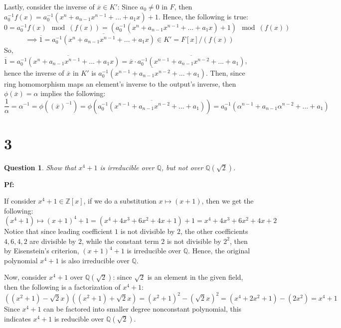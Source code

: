 \documentclass{article}
\newtheorem{question}{Question}
\begin{document}
\hfil

Lastly, consider the inverse of $\overline{x}\in K'$: Since $a_0\neq 0$ in $F$, then $a_0^{-1}f(x)=a_0^{-1}(x^n+a_{n-1}x^{n-1}+...+a_1x)+1$.
Hence, the following is true:
$$0=a_0^{-1}f(x)\mod (f(x)) = (a_0^{-1}(x^n+a_{n-1}x^{n-1}+...+a_1x)+1)\mod (f(x))$$
$$\implies \overline{1}=\overline{a_0^{-1}(x^n+a_{n-1}x^{n-1}+...+a_1x)}\in K' = F[x]/(f(x))$$
So, $\overline{1}=\overline{a_0^{-1}(x^n+a_{n-1}x^{n-1}+...+a_1x)}=\overline{x}\cdot \overline{a_0^{-1}(x^{n-1}+a_{n-1}x^{n-2}+...+a_1)}$, hence the inverse of $\overline{x}$ in $K'$ is $\overline{a_0^{-1}(x^{n-1}+a_{n-1}x^{n-2}+...+a_1)}$.
Then, since ring homomorphism maps an element's inverse to the output's inverse, then $\phi(\overline{x})=\alpha$ implies the following: 
$$\frac{1}{\alpha}=\alpha^{-1}=\phi((\overline{x})^{-1})=\phi\left(\overline{a_0^{-1}(x^{n-1}+a_{n-1}x^{n-2}+...+a_1)}\right)=a_0^{-1}(\alpha^{n-1}+a_{n-1}\alpha^{n-2}+...+a_1)$$


\break

\section*{3}
\begin{myBox}[]{}
    \begin{question}
        Show that $x^4+1$ is irreducible over $\mathbb{Q}$, but not over $\mathbb{Q}(\sqrt{2})$.
    \end{question}
\end{myBox}

\textbf{Pf:}

If consider $x^4+1\in \mathbb{Z}[x]$, if we do a substitution $x\mapsto (x+1)$, then we get the following:
$$(x^4+1)\mapsto (x+1)^4+1 =(x^4+4x^3+6x^2+4x+1)+1 = x^4+4x^3+6x^2+4x+2$$
Notice that since leading coefficient $1$ is not divisible by $2$, the other coefficients $4,6,4,2$ are divisible by $2$,
while the constant term $2$ is not divisible by $2^2$, then by Eisenstein's criterion, $(x+1)^4+1$ is irreducible over $\mathbb{Q}$.
Hence, the original polynomial $x^4+1$ is also irreducible over $\mathbb{Q}$.

\hfil

Now, consider $x^4+1$ over $\mathbb{Q}(\sqrt{2})$: since $\sqrt{2}$ is an element in the given field, then the following is a factorization of $x^4+1$:
$$((x^2+1)-\sqrt{2}x)((x^2+1)+\sqrt{2}x)=(x^2+1)^2-(\sqrt{2}x)^2=(x^4+2x^2+1)-(2x^2)=x^4+1$$
Since $x^4+1$ can be factored into smaller degree nonconstant polynomial, this indicates $x^4+1$ is reducible over $\mathbb{Q}(\sqrt{2})$.
\end{document}
